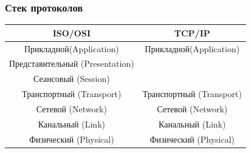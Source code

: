 \begin{frame}
    \frametitle{Стек протоколов}
        
    \begin{table}
        \centering
        \begin{tabular}{|c|c|}
            \hline\hline
            ISO/OSI                         & TCP/IP\\ \hline\hline
            Прикладной(Application)         & Прикладной(Application)   \\ \cline{1-1}
            Представительный (Presentation) &                           \\ \cline{1-1}
            Сеансовый (Session)             &                           \\ \hline
            Транспортный (Transport)        & Транспортный (Transport)  \\ \hline
            Сетевой (Network)               & Сетевой (Network)         \\ \hline
            Канальный (Link)                & Канальный (Link)          \\ \hline
            Физический (Physical)           & Физический (Physical)     \\ \hline
        \end{tabular}
    \end{table}
\end{frame}



